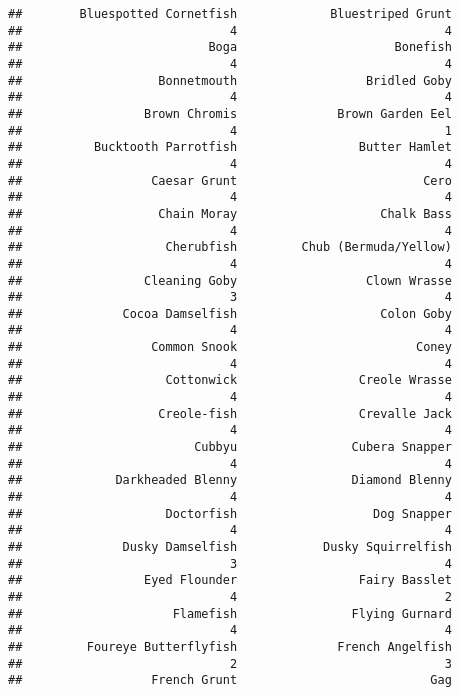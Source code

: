 \documentclass[
]{article}
\begin{document}
\begin{verbatim}
##        Bluespotted Cornetfish             Bluestriped Grunt 
##                             4                             4 
##                          Boga                      Bonefish 
##                             4                             4 
##                   Bonnetmouth                  Bridled Goby 
##                             4                             4 
##                 Brown Chromis              Brown Garden Eel 
##                             4                             1 
##          Bucktooth Parrotfish                 Butter Hamlet 
##                             4                             4 
##                  Caesar Grunt                          Cero 
##                             4                             4 
##                   Chain Moray                    Chalk Bass 
##                             4                             4 
##                    Cherubfish         Chub (Bermuda/Yellow) 
##                             4                             4 
##                 Cleaning Goby                  Clown Wrasse 
##                             3                             4 
##              Cocoa Damselfish                    Colon Goby 
##                             4                             4 
##                  Common Snook                         Coney 
##                             4                             4 
##                    Cottonwick                 Creole Wrasse 
##                             4                             4 
##                   Creole-fish                 Crevalle Jack 
##                             4                             4 
##                        Cubbyu                Cubera Snapper 
##                             4                             4 
##             Darkheaded Blenny                Diamond Blenny 
##                             4                             4 
##                    Doctorfish                   Dog Snapper 
##                             4                             4 
##              Dusky Damselfish            Dusky Squirrelfish 
##                             3                             4 
##                 Eyed Flounder                 Fairy Basslet 
##                             4                             2 
##                     Flamefish                Flying Gurnard 
##                             4                             4 
##         Foureye Butterflyfish              French Angelfish 
##                             2                             3 
##                  French Grunt                           Gag 

\end{verbatim}
\end{document}

